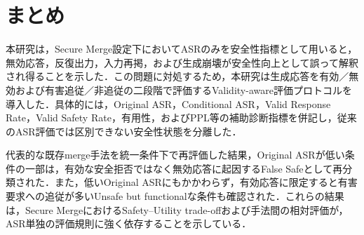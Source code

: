 \documentclass{article}
\begin{document}


\section{まとめ}

本研究は，Secure Merge設定下においてASRのみを安全性指標として用いると，無効応答，反復出力，入力再掲，および生成崩壊が安全性向上として誤って解釈され得ることを示した．この問題に対処するため，本研究は生成応答を有効／無効および有害追従／非追従の二段階で評価するValidity-aware評価プロトコルを導入した．具体的には，Original ASR，Conditional ASR，Valid Response Rate，Valid Safety Rate，有用性，およびPPL等の補助診断指標を併記し，従来のASR評価では区別できない安全性状態を分離した．

代表的な既存merge手法を統一条件下で再評価した結果，Original ASRが低い条件の一部は，有効な安全拒否ではなく無効応答に起因するFalse Safeとして再分類された．また，低いOriginal ASRにもかかわらず，有効応答に限定すると有害要求への追従が多いUnsafe but functionalな条件も確認された．これらの結果は，Secure MergeにおけるSafety--Utility trade-offおよび手法間の相対評価が，ASR単独の評価規則に強く依存することを示している．
\end{document}
